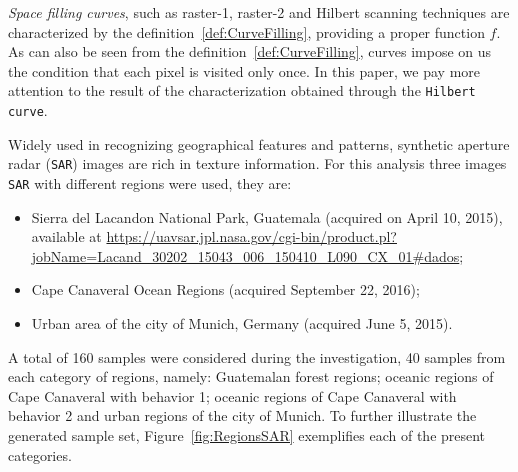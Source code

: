 \documentclass{isprs}
\begin{document}
\textit{Space filling curves}, such as raster-1, raster-2 and Hilbert scanning techniques are characterized by the definition~\ref{def:CurveFilling}, providing a proper function $f$.
As can also be seen from the definition~\ref{def:CurveFilling}, curves impose on us the condition that each pixel is visited only once.
In this paper, we pay more attention to the result of the characterization obtained through the \texttt{Hilbert curve}.
	
Widely used in recognizing geographical features and patterns, synthetic aperture radar (\texttt{SAR}) images are rich in texture information. For this analysis three images \texttt{SAR} with different regions were used, they are:
	
\begin{itemize}
	\item Sierra del Lacandon National Park, Guatemala (acquired on April 10, 2015), available at \url{https://uavsar.jpl.nasa.gov/cgi-bin/product.pl?jobName=Lacand_30202_15043_006_150410_L090_CX_01#dados};
	\item Cape Canaveral Ocean Regions (acquired September 22, 2016);
	\item Urban area of the city of Munich, Germany (acquired June 5, 2015).
\end{itemize}
	
A total of 160 samples were considered during the investigation, 40 samples from each category of regions, namely: Guatemalan forest regions; oceanic regions of Cape Canaveral with behavior 1; oceanic regions of Cape Canaveral with behavior 2 and urban regions of the city of Munich. To further illustrate the generated sample set, Figure~\ref{fig:RegionsSAR} exemplifies each of the present categories.
	
\end{document}
